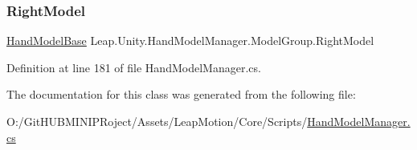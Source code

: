 \subsubsection{\texorpdfstring{RightModel}{RightModel}}
{\footnotesize\ttfamily \mbox{\hyperlink{class_leap_1_1_unity_1_1_hand_model_base}{Hand\+Model\+Base}} Leap.\+Unity.\+Hand\+Model\+Manager.\+Model\+Group.\+Right\+Model}



Definition at line 181 of file Hand\+Model\+Manager.\+cs.



The documentation for this class was generated from the following file\+:\begin{DoxyCompactItemize}
\item 
O\+:/\+Git\+H\+U\+B\+M\+I\+N\+I\+P\+Roject/\+Assets/\+Leap\+Motion/\+Core/\+Scripts/\mbox{\hyperlink{_hand_model_manager_8cs}{Hand\+Model\+Manager.\+cs}}\end{DoxyCompactItemize}
